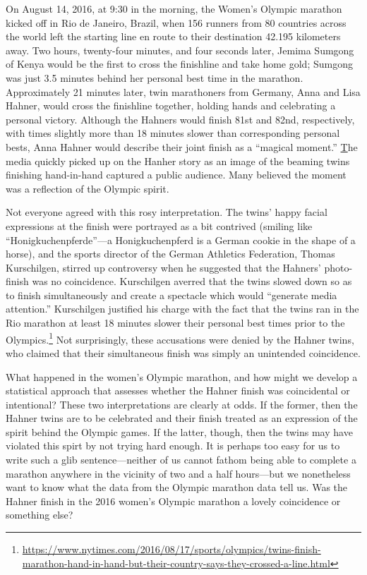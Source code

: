 \documentclass[12pt,titlepage]{article}
\begin{document}
On August 14, 2016, at 9:30 in the morning, the Women's Olympic
marathon kicked off in Rio de Janeiro, Brazil, when 156 runners from
80 countries across the world left the starting line en route to their
destination 42.195 kilometers away. Two hours, twenty-four minutes,
and four seconds later, Jemima Sumgong of Kenya would be the first to
cross the finishline and take home gold; Sumgong was just 3.5 minutes
behind her personal best time in the marathon. Approximately 21
minutes later, twin marathoners from Germany, Anna and Lisa Hahner,
would cross the finishline together, holding hands and celebrating a
personal victory. Although the Hahners would finish 81st and 82nd,
respectively, with times slightly more than 18 minutes slower than
corresponding personal bests, Anna Hahner would describe their joint
finish as a ``magical moment.''
\href{https://www.nytimes.com/2016/08/17/sports/olympics/twins-finish-marathon-hand-in-hand-but-their-country-says-they-crossed-a-line.html}
The media quickly picked up on the Hanher story as an image of the
beaming twins finishing hand-in-hand captured a public audience. Many
believed the moment was a reflection of the Olympic spirit.

Not everyone agreed with this rosy interpretation. The twins' happy
facial expressions at the finish were portrayed as a bit contrived
(smiling like ``Honigkuchenpferde''---a Honigkuchenpferd is a German
cookie in the shape of a horse), and the sports director of the German
Athletics Federation, Thomas Kurschilgen, stirred up controversy when
he suggested that the Hahners' photo-finish was no coincidence.
Kurschilgen averred that the twins slowed down so as to finish
simultaneously and create a spectacle which would ``generate media
attention.'' Kurschilgen justified his charge with the fact that the
twins ran in the Rio marathon at least 18 minutes slower their
personal best times prior to the
Olympics.\footnote{\url{https://www.nytimes.com/2016/08/17/sports/olympics/twins-finish-marathon-hand-in-hand-but-their-country-says-they-crossed-a-line.html}}
Not surprisingly, these accusations were denied by the Hahner twins,
who claimed that their simultaneous finish was simply an unintended
coincidence.



What happened in the women's Olympic marathon, and how might we
develop a statistical approach that assesses whether the Hahner finish
was coincidental or intentional?  These two interpretations are
clearly at odds. If the former, then the Hahner twins are to be
celebrated and their finish treated as an expression of the spirit
behind the Olympic games. If the latter, though, then the twins may
have violated this spirt by not trying hard enough. It is perhaps too
easy for us to write such a glib sentence---neither of us cannot
fathom being able to complete a marathon anywhere in the vicinity of
two and a half hours---but we nonetheless want to know what the data
from the Olympic marathon data tell us.  Was the Hahner finish in the
2016 women's Olympic marathon a lovely coincidence or something else?
\end{document}
